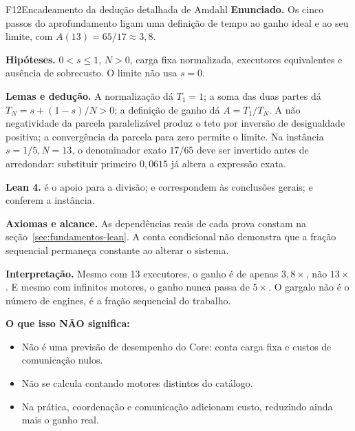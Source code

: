 \begin{formalizacao}{F12}{Encadeamento da dedução detalhada de Amdahl}
\textbf{Enunciado.} Os cinco passos do aprofundamento ligam uma definição de tempo ao ganho ideal e ao seu limite, com $A(13)=65/17\approx3{,}8$.

\textbf{Hipóteses.} $0<s\leq1$, $N>0$, carga fixa normalizada, executores equivalentes e ausência de sobrecusto. O limite não usa $s=0$.

\textbf{Lemas e dedução.} A normalização dá $T_1=1$; a soma das duas partes dá $T_N=s+(1-s)/N>0$; a definição de ganho dá $A=T_1/T_N$. A não negatividade da parcela paralelizável produz o teto por inversão de desigualdade positiva; a convergência da parcela para zero permite o limite. Na instância $s=1/5,N=13$, o denominador exato $17/65$ deve ser invertido antes de arredondar: substituir primeiro $0{,}0615$ já altera a expressão exata.

\textbf{Lean 4.}  é o apoio para a divisão;  e  correspondem às conclusões gerais;  e  conferem a instância.

\textbf{Axiomas e alcance.} As dependências reais de cada prova constam na seção~\ref{sec:fundamentos-lean}. A conta condicional não demonstra que a fração sequencial permaneça constante ao alterar o sistema.
\end{formalizacao}

\begin{descricao}
\textbf{Interpretação.} Mesmo com 13 executores, o ganho é de apenas $3{,}8\times$, não $13\times$. E mesmo com infinitos motores, o ganho nunca passa de $5\times$. O gargalo não é o número de engines, é a fração sequencial do trabalho.

\textbf{O que isso NÃO significa:}
\begin{itemize}[leftmargin=1.3em,itemsep=1pt]
  \item Não é uma previsão de desempenho do Core: conta carga fixa e custos de comunicação nulos.
  \item Não se calcula contando motores distintos do catálogo.
  \item Na prática, coordenação e comunicação adicionam custo, reduzindo ainda mais o ganho real.
\end{itemize}
\end{descricao}

